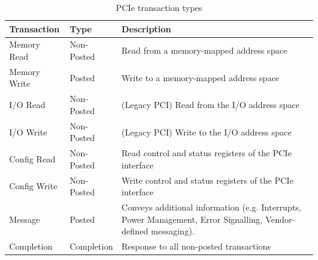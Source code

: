 \begin{table}[!htb]
    \centering
    \begin{tabular}{|l|l|p{}|}
        \hline
        \textbf{Transaction} & \textbf{Type} & \textbf{Description} \\ 
        \hline
        Memory Read  & Non-Posted & Read from a memory-mapped address space \\ 
        Memory Write & Posted     & Write to a memory-mapped address space  \\ 
        I/O Read     & Non-Posted & (Legacy PCI) Read from the I/O address space \\ 
        I/O Write    & Non-Posted & (Legacy PCI) Write to the I/O address space \\ 
        Config Read  & Non-Posted & Read control and status registers of the PCIe interface \\ 
        Config Write & Non-Posted & Write control and status registers of the PCIe interface \\  
        Message      & Posted     & Conveys additional information (e.g. Interrupts, Power Management, Error Signalling, Vendor-defined messaging). \\
        Completion   & Completion & Response to all non-posted transactions \\ 
        \hline
    \end{tabular}
    \caption{PCIe transaction types}
    \label{tab:pcie-transaction-types}
\end{table}


